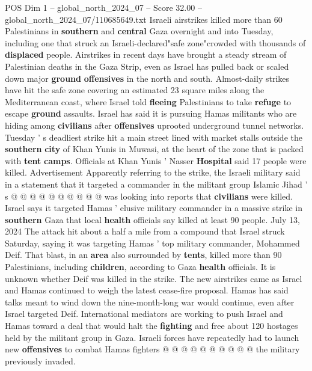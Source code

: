 \begin{textsample}{POS Dim 1 – global\_north\_2024\_07 – Score 32.00 – global\_north\_2024\_07/110685649.txt}  \label{ex:f1_pos_387}
Israeli airstrikes killed more than 60 Palestinians in \textbf{southern} and \textbf{central} Gaza overnight and into Tuesday, including one that struck an Israeli-declared"safe zone"crowded with thousands of \textbf{displaced} people.
Airstrikes in recent days have brought a steady stream of Palestinian deaths in the Gaza Strip, even as Israel has pulled back or scaled down major \textbf{ground} \textbf{offensives} in the north and south.
Almost-daily strikes have hit the safe zone covering an estimated 23 square miles along the Mediterranean coast, where Israel told \textbf{fleeing} Palestinians to take \textbf{refuge} to escape \textbf{ground} assaults.
Israel has said it is pursuing Hamas militants who are hiding among \textbf{civilians} after \textbf{offensives} uprooted underground tunnel networks.
Tuesday ' s deadliest strike hit a main street lined with market stalls outside the \textbf{southern} \textbf{city} of Khan Yunis in Muwasi, at the heart of the zone that is packed with \textbf{tent} \textbf{camps}.
Officials at Khan Yunis ' Nasser \textbf{Hospital} said 17 people were killed.
Advertisement Apparently referring to the strike, the Israeli military said in a statement that it targeted a commander in the militant group Islamic Jihad ' s @ @ @ @ @ @ @ @ @ @ was looking into reports that \textbf{civilians} were killed.
Israel says it targeted Hamas ' elusive military commander in a massive strike in \textbf{southern} Gaza that local \textbf{health} officials say killed at least 90 people.
July 13, 2024 The attack hit about a half a mile from a compound that Israel struck Saturday, saying it was targeting Hamas ' top military commander, Mohammed Deif.
That blast, in an \textbf{area} also surrounded by \textbf{tents}, killed more than 90 Palestinians, including \textbf{children}, according to Gaza \textbf{health} officials.
It is unknown whether Deif was killed in the strike.
The new airstrikes came as Israel and Hamas continued to weigh the latest cease-fire proposal.
Hamas has said talks meant to wind down the nine-month-long war would continue, even after Israel targeted Deif.
International mediators are working to push Israel and Hamas toward a deal that would halt the \textbf{fighting} and free about 120 hostages held by the militant group in Gaza.
Israeli forces have repeatedly had to launch new \textbf{offensives} to combat Hamas fighters @ @ @ @ @ @ @ @ @ @ the military previously invaded.

\end{textsample}
